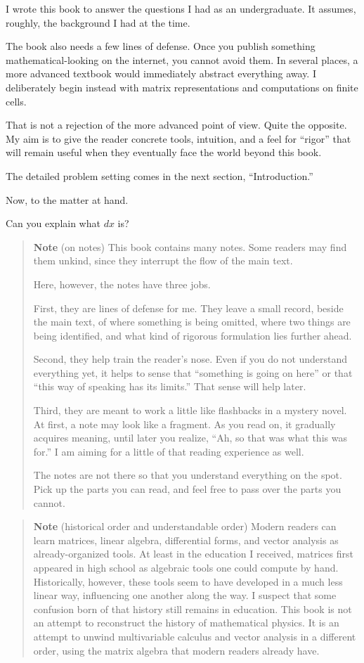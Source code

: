 \documentclass[a4paper,12pt,openany]{book}
\begin{document}
I wrote this book to answer the questions I had as an undergraduate. It
assumes, roughly, the background I had at the time.

The book also needs a few lines of defense. Once you publish something
mathematical-looking on the internet, you cannot avoid them. In several
places, a more advanced textbook would immediately abstract everything
away. I deliberately begin instead with matrix representations and
computations on finite cells.

That is not a rejection of the more advanced point of view. Quite the
opposite. My aim is to give the reader concrete tools, intuition, and a
feel for ``rigor'' that will remain useful when they eventually face the
world beyond this book.

The detailed problem setting comes in the next section,
``Introduction.''

Now, to the matter at hand.

Can you explain what \(dx\) is?

\begin{quote}
\textbf{Note} (on notes) This book contains many notes. Some readers may
find them unkind, since they interrupt the flow of the main text.

Here, however, the notes have three jobs.

First, they are lines of defense for me. They leave a small record,
beside the main text, of where something is being omitted, where two
things are being identified, and what kind of rigorous formulation lies
further ahead.

Second, they help train the reader's nose. Even if you do not understand
everything yet, it helps to sense that ``something is going on here'' or
that ``this way of speaking has its limits.'' That sense will help
later.

Third, they are meant to work a little like flashbacks in a mystery
novel. At first, a note may look like a fragment. As you read on, it
gradually acquires meaning, until later you realize, ``Ah, so that was
what this was for.'' I am aiming for a little of that reading experience
as well.

The notes are not there so that you understand everything on the spot.
Pick up the parts you can read, and feel free to pass over the parts you
cannot.
\end{quote}

\begin{quote}
\textbf{Note} (historical order and understandable order) Modern readers
can learn matrices, linear algebra, differential forms, and vector
analysis as already-organized tools. At least in the education I
received, matrices first appeared in high school as algebraic tools one
could compute by hand. Historically, however, these tools seem to have
developed in a much less linear way, influencing one another along the
way. I suspect that some confusion born of that history still remains in
education. This book is not an attempt to reconstruct the history of
mathematical physics. It is an attempt to unwind multivariable calculus
and vector analysis in a different order, using the matrix algebra that
modern readers already have.
\end{quote}
\end{document}

